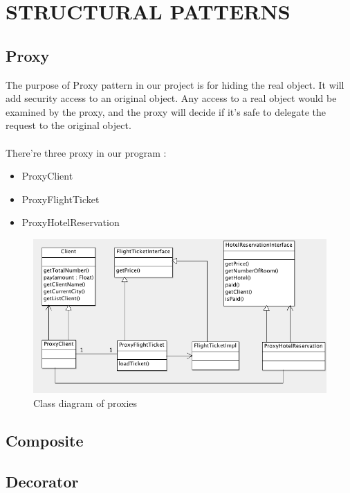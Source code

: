 \section{STRUCTURAL PATTERNS}

\subsection{Proxy}
The purpose of Proxy pattern in our project is for hiding the real object. It will add security access to an original object. Any access to a real object would be examined by the proxy, and the proxy will decide if it's safe to delegate the request to the original object. 

\paragraph{}
There're three proxy in our program :
\begin{itemize}
\item ProxyClient
\item ProxyFlightTicket
\item ProxyHotelReservation
\end{itemize}

\begin{figure}[h]
\centering
\includegraphics[width=12cm]{project/images/proxy.png}
\caption{Class diagram of proxies}
\end{figure}


\subsection{Composite}

\subsection{Decorator}